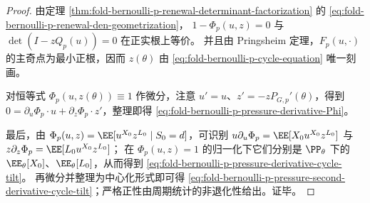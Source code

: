 \begin{proof}
由定理 \ref{thm:fold-bernoulli-p-renewal-determinant-factorization} 的 \eqref{eq:fold-bernoulli-p-renewal-den-geometrization}，
\(
1-\Phi_p(u,z)=0
\)
与
\(
\det(I-zQ_p(u))=0
\)
在正实根上等价。
并且由 Pringsheim 定理，\(F_p(u,\cdot)\) 的主奇点为最小正根，因而 \(z(\theta)\) 由 \eqref{eq:fold-bernoulli-p-cycle-equation} 唯一刻画。

对恒等式 \(\Phi_p(u,z(\theta))\equiv 1\) 作微分，注意 \(u'=u\)、\(z'=-zP_{G,p}'(\theta)\)，得到
\(
0=\partial_u\Phi_p\cdot u+\partial_z\Phi_p\cdot z'
\)，整理即得 \eqref{eq:fold-bernoulli-p-pressure-derivative-Phi}。

最后，由 \(\Phi_p(u,z)=\EE[u^{X_0}z^{L_0}\mid S_0=d]\)，可识别
\(
u\partial_u\Phi_p=\EE[X_0u^{X_0}z^{L_0}]
\) 与
\(
z\partial_z\Phi_p=\EE[L_0u^{X_0}z^{L_0}]
\)；
在 \(\Phi_p(u,z)=1\) 的归一化下它们分别是 \(\PP_\theta\) 下的 \(\EE_\theta[X_0]\)、\(\EE_\theta[L_0]\)，从而得到 \eqref{eq:fold-bernoulli-p-pressure-derivative-cycle-tilt}。
再微分并整理为中心化形式即可得 \eqref{eq:fold-bernoulli-p-pressure-second-derivative-cycle-tilt}；严格正性由周期统计的非退化性给出。证毕。
\end{proof}



